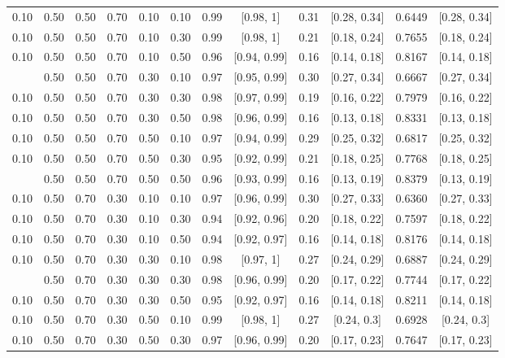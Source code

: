 \documentclass[
  11pt,
]{article}
\begin{document}
\begin{landscape}
\begin{ThreePartTable}
\begin{longtable}[t]{cccccccccccc}
0.10 & 0.50 & 0.50 & 0.70 & 0.10 & 0.10 & 0.99 & {}[0.98, 1] & 0.31 & {}[0.28, 0.34] & 0.6449 & {}[0.28, 0.34]\\
0.10 & 0.50 & 0.50 & 0.70 & 0.10 & 0.30 & 0.99 & {}[0.98, 1] & 0.21 & {}[0.18, 0.24] & 0.7655 & {}[0.18, 0.24]\\
0.10 & 0.50 & 0.50 & 0.70 & 0.10 & 0.50 & 0.96 & {}[0.94, 0.99] & 0.16 & {}[0.14, 0.18] & 0.8167 & {}[0.14, 0.18]\\
\addlinespace
0.10 & 0.50 & 0.50 & 0.70 & 0.30 & 0.10 & 0.97 & {}[0.95, 0.99] & 0.30 & {}[0.27, 0.34] & 0.6667 & {}[0.27, 0.34]\\
0.10 & 0.50 & 0.50 & 0.70 & 0.30 & 0.30 & 0.98 & {}[0.97, 0.99] & 0.19 & {}[0.16, 0.22] & 0.7979 & {}[0.16, 0.22]\\
0.10 & 0.50 & 0.50 & 0.70 & 0.30 & 0.50 & 0.98 & {}[0.96, 0.99] & 0.16 & {}[0.13, 0.18] & 0.8331 & {}[0.13, 0.18]\\
0.10 & 0.50 & 0.50 & 0.70 & 0.50 & 0.10 & 0.97 & {}[0.94, 0.99] & 0.29 & {}[0.25, 0.32] & 0.6817 & {}[0.25, 0.32]\\
0.10 & 0.50 & 0.50 & 0.70 & 0.50 & 0.30 & 0.95 & {}[0.92, 0.99] & 0.21 & {}[0.18, 0.25] & 0.7768 & {}[0.18, 0.25]\\
\addlinespace
0.10 & 0.50 & 0.50 & 0.70 & 0.50 & 0.50 & 0.96 & {}[0.93, 0.99] & 0.16 & {}[0.13, 0.19] & 0.8379 & {}[0.13, 0.19]\\
0.10 & 0.50 & 0.70 & 0.30 & 0.10 & 0.10 & 0.97 & {}[0.96, 0.99] & 0.30 & {}[0.27, 0.33] & 0.6360 & {}[0.27, 0.33]\\
0.10 & 0.50 & 0.70 & 0.30 & 0.10 & 0.30 & 0.94 & {}[0.92, 0.96] & 0.20 & {}[0.18, 0.22] & 0.7597 & {}[0.18, 0.22]\\
0.10 & 0.50 & 0.70 & 0.30 & 0.10 & 0.50 & 0.94 & {}[0.92, 0.97] & 0.16 & {}[0.14, 0.18] & 0.8176 & {}[0.14, 0.18]\\
0.10 & 0.50 & 0.70 & 0.30 & 0.30 & 0.10 & 0.98 & {}[0.97, 1] & 0.27 & {}[0.24, 0.29] & 0.6887 & {}[0.24, 0.29]\\
\addlinespace
0.10 & 0.50 & 0.70 & 0.30 & 0.30 & 0.30 & 0.98 & {}[0.96, 0.99] & 0.20 & {}[0.17, 0.22] & 0.7744 & {}[0.17, 0.22]\\
0.10 & 0.50 & 0.70 & 0.30 & 0.30 & 0.50 & 0.95 & {}[0.92, 0.97] & 0.16 & {}[0.14, 0.18] & 0.8211 & {}[0.14, 0.18]\\
0.10 & 0.50 & 0.70 & 0.30 & 0.50 & 0.10 & 0.99 & {}[0.98, 1] & 0.27 & {}[0.24, 0.3] & 0.6928 & {}[0.24, 0.3]\\
0.10 & 0.50 & 0.70 & 0.30 & 0.50 & 0.30 & 0.97 & {}[0.96, 0.99] & 0.20 & {}[0.17, 0.23] & 0.7647 & {}[0.17, 0.23]\\

\end{longtable}
\end{ThreePartTable}
\end{landscape}
\end{document}
